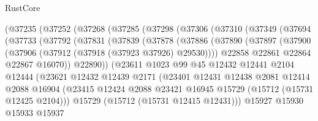 \begin{lexlean}{RustCore}
\begin{coremodule}
          (@37235
            (@37252
              (@37268
                (@37285
                  (@37298
                    (@37306
                      (@37310
                        (@37349
                          (@37694
                            (@37733
                              (@37792
                                (@37831
                                  (@37839
                                    (@37878
                                      (@37886
                                        (@37890
                                          (@37897
                                            (@37900
                                              (@37906 (@37912 (@37918 (@37923 @37926) @29530))))
                                            @22858
                                            @22861
                                            @22864
                                            @22867
                                            @16070))
                                        @22890))
                                    (@23611
                                      @1023
                                      @99
                                      @45
                                      @12432
                                      @12441
                                      @2104
                                      @12444
                                      (@23621
                                        @12432
                                        @12439
                                        @2171
                                        (@23401
                                          @12431
                                          @12438
                                          @2081
                                          @12414
                                          @2088
                                          @16904
                                          (@23415
                                            @12424
                                            @2088
                                            @23421
                                            @16945
                                            @15729
                                            (@15712 (@15731 @12425 @2104)))
                                          @15729
                                          (@15712 (@15731 @12415 @12431)))
                                        @15927
                                        @15930
                                        @15933
                                        @15937

\end{coremodule}
\end{lexlean}
